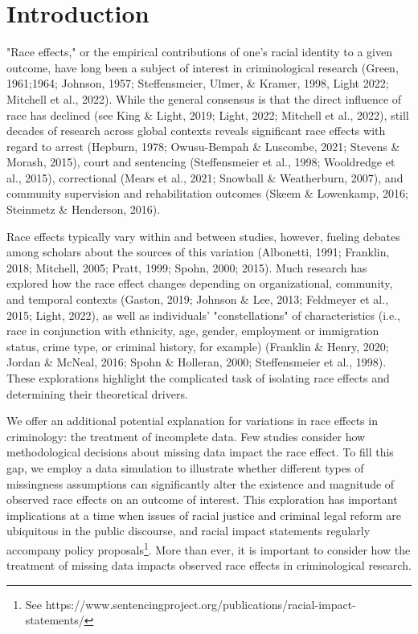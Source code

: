 \documentclass[titlepage]{article}
\begin{document}
\section{Introduction}

"Race effects," or the empirical contributions of one’s racial identity to a given outcome, have long been a subject of interest in criminological research (Green, 1961;1964; Johnson, 1957; Steffensmeier, Ulmer, \& Kramer, 1998, Light 2022; Mitchell et al., 2022). While the general consensus is that the direct influence of race has declined (see King \& Light, 2019; Light, 2022; Mitchell et al., 2022), still decades of research across global contexts reveals significant race effects with regard to arrest (Hepburn, 1978; Owusu-Bempah \& Luscombe, 2021; Stevens \& Morash, 2015), court and sentencing (Steffensmeier et al., 1998; Wooldredge et al., 2015), correctional (Mears et al., 2021; Snowball \& Weatherburn, 2007), and community supervision and rehabilitation outcomes (Skeem \& Lowenkamp, 2016; Steinmetz \& Henderson, 2016).

Race effects typically vary within and between studies, however, fueling debates among scholars about the sources of this variation (Albonetti, 1991; Franklin, 2018; Mitchell, 2005; Pratt, 1999; Spohn, 2000; 2015). Much research has explored how the race effect changes depending on organizational, community, and temporal contexts (Gaston, 2019; Johnson \& Lee, 2013; Feldmeyer et al., 2015; Light, 2022), as well as individuals’ "constellations" of characteristics (i.e., race in conjunction with ethnicity, age, gender, employment or immigration status, crime type, or criminal history, for example) (Franklin \& Henry, 2020; Jordan \& McNeal, 2016; Spohn \& Holleran, 2000; Steffensmeier et al., 1998). These explorations highlight the complicated task of isolating race effects and determining their theoretical drivers.

We offer an additional potential explanation for variations in race effects in criminology: the treatment of incomplete data. Few studies consider how methodological decisions about missing data impact the race effect. To fill this gap, we employ a data simulation to illustrate whether different types of missingness assumptions can significantly alter the existence and magnitude of observed race effects on an outcome of interest. This exploration has important implications at a time when issues of racial justice and criminal legal reform are ubiquitous in the public discourse, and racial impact statements regularly accompany policy proposals\footnote{See https://www.sentencingproject.org/publications/racial-impact-statements/}.  More than ever, it is important to consider how the treatment of missing data impacts observed race effects in criminological research.
\end{document}
